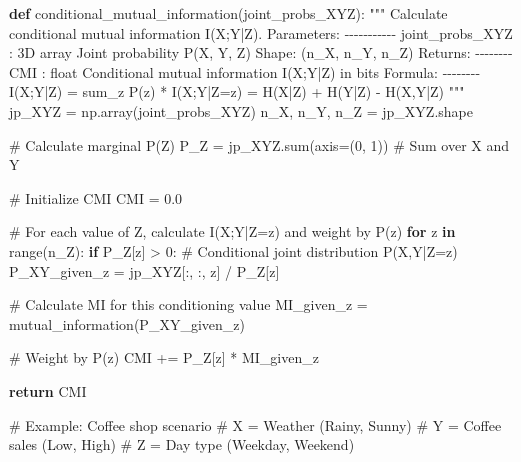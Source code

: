 \documentclass[
  11pt,
  letterpaper,
  oneside,
  openany]{book}
\newenvironment{Shaded}{\begin{snugshade}}{\end{snugshade}}
\newcommand{\BuiltInTok}[1]{\textcolor[rgb]{0.00,0.23,0.31}{#1}}
\newcommand{\CommentTok}[1]{\textcolor[rgb]{0.37,0.37,0.37}{#1}}
\newcommand{\ControlFlowTok}[1]{\textcolor[rgb]{0.00,0.23,0.31}{\textbf{#1}}}
\newcommand{\DecValTok}[1]{\textcolor[rgb]{0.68,0.00,0.00}{#1}}
\newcommand{\FloatTok}[1]{\textcolor[rgb]{0.68,0.00,0.00}{#1}}
\newcommand{\KeywordTok}[1]{\textcolor[rgb]{0.00,0.23,0.31}{\textbf{#1}}}
\newcommand{\NormalTok}[1]{\textcolor[rgb]{0.00,0.23,0.31}{#1}}
\newcommand{\OperatorTok}[1]{\textcolor[rgb]{0.37,0.37,0.37}{#1}}
\begin{document}
\begin{Shaded}
\begin{Highlighting}[]
\KeywordTok{def}\NormalTok{ conditional\_mutual\_information(joint\_probs\_XYZ):}
    \CommentTok{"""}
\CommentTok{    Calculate conditional mutual information I(X;Y|Z).}
\CommentTok{    }
\CommentTok{    Parameters:}
\CommentTok{    {-}{-}{-}{-}{-}{-}{-}{-}{-}{-}{-}}
\CommentTok{    joint\_probs\_XYZ : 3D array}
\CommentTok{        Joint probability P(X, Y, Z)}
\CommentTok{        Shape: (n\_X, n\_Y, n\_Z)}
\CommentTok{        }
\CommentTok{    Returns:}
\CommentTok{    {-}{-}{-}{-}{-}{-}{-}{-}}
\CommentTok{    CMI : float}
\CommentTok{        Conditional mutual information I(X;Y|Z) in bits}
\CommentTok{        }
\CommentTok{    Formula:}
\CommentTok{    {-}{-}{-}{-}{-}{-}{-}{-}}
\CommentTok{    I(X;Y|Z) = sum\_z P(z) * I(X;Y|Z=z)}
\CommentTok{             = H(X|Z) + H(Y|Z) {-} H(X,Y|Z)}
\CommentTok{    """}
\NormalTok{    jp\_XYZ }\OperatorTok{=}\NormalTok{ np.array(joint\_probs\_XYZ)}
\NormalTok{    n\_X, n\_Y, n\_Z }\OperatorTok{=}\NormalTok{ jp\_XYZ.shape}
    
    \CommentTok{\# Calculate marginal P(Z)}
\NormalTok{    P\_Z }\OperatorTok{=}\NormalTok{ jp\_XYZ.}\BuiltInTok{sum}\NormalTok{(axis}\OperatorTok{=}\NormalTok{(}\DecValTok{0}\NormalTok{, }\DecValTok{1}\NormalTok{))  }\CommentTok{\# Sum over X and Y}
    
    \CommentTok{\# Initialize CMI}
\NormalTok{    CMI }\OperatorTok{=} \FloatTok{0.0}
    
    \CommentTok{\# For each value of Z, calculate I(X;Y|Z=z) and weight by P(z)}
    \ControlFlowTok{for}\NormalTok{ z }\KeywordTok{in} \BuiltInTok{range}\NormalTok{(n\_Z):}
        \ControlFlowTok{if}\NormalTok{ P\_Z[z] }\OperatorTok{\textgreater{}} \DecValTok{0}\NormalTok{:}
            \CommentTok{\# Conditional joint distribution P(X,Y|Z=z)}
\NormalTok{            P\_XY\_given\_z }\OperatorTok{=}\NormalTok{ jp\_XYZ[:, :, z] }\OperatorTok{/}\NormalTok{ P\_Z[z]}
            
            \CommentTok{\# Calculate MI for this conditioning value}
\NormalTok{            MI\_given\_z }\OperatorTok{=}\NormalTok{ mutual\_information(P\_XY\_given\_z)}
            
            \CommentTok{\# Weight by P(z)}
\NormalTok{            CMI }\OperatorTok{+=}\NormalTok{ P\_Z[z] }\OperatorTok{*}\NormalTok{ MI\_given\_z}
    
    \ControlFlowTok{return}\NormalTok{ CMI}


\CommentTok{\# Example: Coffee shop scenario}
\CommentTok{\# X = Weather (Rainy, Sunny)}
\CommentTok{\# Y = Coffee sales (Low, High) }
\CommentTok{\# Z = Day type (Weekday, Weekend)}


\end{Highlighting}
\end{Shaded}
\end{document}
